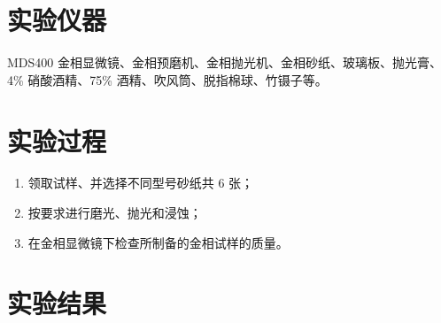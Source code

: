 \documentclass[a4paper,utf8]{article}
\begin{document}
\section{实验仪器}%
    MDS400 金相显微镜、金相预磨机、金相抛光机、金相砂纸、玻璃板、抛光膏、4\% 硝酸酒精、75\% 酒精、吹风筒、脱指棉球、竹镊子等。
\section{实验过程}%
    \begin{enumerate}
        \item 领取试样、并选择不同型号砂纸共 6 张；
        \item 按要求进行磨光、抛光和浸蚀；
        \item 在金相显微镜下检查所制备的金相试样的质量。
    \end{enumerate}
\section{实验结果}
\end{document}
